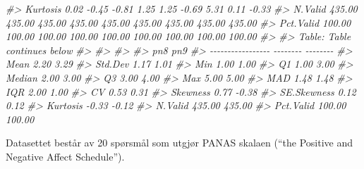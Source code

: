 \documentclass[
]{article}
\newenvironment{Shaded}{\begin{snugshade}}{\end{snugshade}}
\newcommand{\CommentTok}[1]{\textcolor[rgb]{0.56,0.35,0.01}{\textit{#1}}}
\begin{document}
\begin{Shaded}
\begin{Highlighting}[]
\CommentTok{\#\textgreater{}          Kurtosis     0.02    {-}0.45    {-}0.81     1.25     1.25    {-}0.69     5.31     0.11    {-}0.33}
\CommentTok{\#\textgreater{}           N.Valid   435.00   435.00   435.00   435.00   435.00   435.00   435.00   435.00   435.00}
\CommentTok{\#\textgreater{}         Pct.Valid   100.00   100.00   100.00   100.00   100.00   100.00   100.00   100.00   100.00}
\CommentTok{\#\textgreater{} }
\CommentTok{\#\textgreater{} Table: Table continues below}
\CommentTok{\#\textgreater{} }
\CommentTok{\#\textgreater{}  }
\CommentTok{\#\textgreater{} }
\CommentTok{\#\textgreater{}                        pn8      pn9}
\CommentTok{\#\textgreater{} {-}{-}{-}{-}{-}{-}{-}{-}{-}{-}{-}{-}{-}{-}{-}{-}{-} {-}{-}{-}{-}{-}{-}{-}{-} {-}{-}{-}{-}{-}{-}{-}{-}}
\CommentTok{\#\textgreater{}              Mean     2.20     3.29}
\CommentTok{\#\textgreater{}           Std.Dev     1.17     1.01}
\CommentTok{\#\textgreater{}               Min     1.00     1.00}
\CommentTok{\#\textgreater{}                Q1     1.00     3.00}
\CommentTok{\#\textgreater{}            Median     2.00     3.00}
\CommentTok{\#\textgreater{}                Q3     3.00     4.00}
\CommentTok{\#\textgreater{}               Max     5.00     5.00}
\CommentTok{\#\textgreater{}               MAD     1.48     1.48}
\CommentTok{\#\textgreater{}               IQR     2.00     1.00}
\CommentTok{\#\textgreater{}                CV     0.53     0.31}
\CommentTok{\#\textgreater{}          Skewness     0.77    {-}0.38}
\CommentTok{\#\textgreater{}       SE.Skewness     0.12     0.12}
\CommentTok{\#\textgreater{}          Kurtosis    {-}0.33    {-}0.12}
\CommentTok{\#\textgreater{}           N.Valid   435.00   435.00}
\CommentTok{\#\textgreater{}         Pct.Valid   100.00   100.00}
\end{Highlighting}
\end{Shaded}

Datasettet består av 20 spørsmål som utgjør PANAS skalaen (``the Positive and Negative Affect Schedule'').
\end{document}
